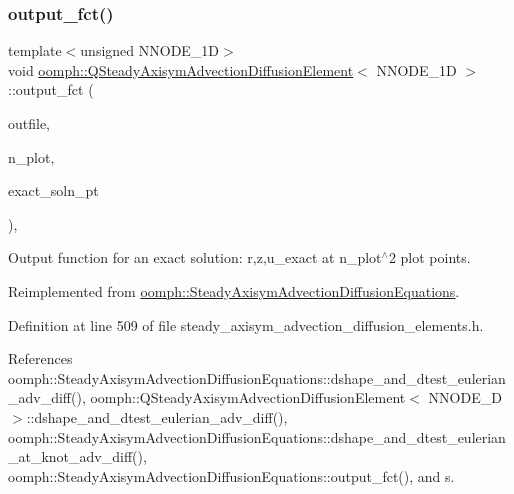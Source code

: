 \subsubsection{\texorpdfstring{output\+\_\+fct()}{output\_fct()}}
{\footnotesize\ttfamily template$<$unsigned N\+N\+O\+D\+E\+\_\+1D$>$ \\
void \hyperlink{classoomph_1_1QSteadyAxisymAdvectionDiffusionElement}{oomph\+::\+Q\+Steady\+Axisym\+Advection\+Diffusion\+Element}$<$ N\+N\+O\+D\+E\+\_\+1D $>$\+::output\+\_\+fct (\begin{DoxyParamCaption}\item[{std\+::ostream \&}]{outfile,  }\item[{const unsigned \&}]{n\+\_\+plot,  }\item[{\hyperlink{classoomph_1_1FiniteElement_a690fd33af26cc3e84f39bba6d5a85202}{Finite\+Element\+::\+Steady\+Exact\+Solution\+Fct\+Pt}}]{exact\+\_\+soln\+\_\+pt }\end{DoxyParamCaption})\hspace{0.3cm}{\ttfamily [inline]}, {\ttfamily [virtual]}}



Output function for an exact solution\+: r,z,u\+\_\+exact at n\+\_\+plot$^\wedge$2 plot points. 



Reimplemented from \hyperlink{classoomph_1_1SteadyAxisymAdvectionDiffusionEquations_a444263cb79d63da6bd1e7b47f9c60c72}{oomph\+::\+Steady\+Axisym\+Advection\+Diffusion\+Equations}.



Definition at line 509 of file steady\+\_\+axisym\+\_\+advection\+\_\+diffusion\+\_\+elements.\+h.



References oomph\+::\+Steady\+Axisym\+Advection\+Diffusion\+Equations\+::dshape\+\_\+and\+\_\+dtest\+\_\+eulerian\+\_\+adv\+\_\+diff(), oomph\+::\+Q\+Steady\+Axisym\+Advection\+Diffusion\+Element$<$ N\+N\+O\+D\+E\+\_\+D $>$\+::dshape\+\_\+and\+\_\+dtest\+\_\+eulerian\+\_\+adv\+\_\+diff(), oomph\+::\+Steady\+Axisym\+Advection\+Diffusion\+Equations\+::dshape\+\_\+and\+\_\+dtest\+\_\+eulerian\+\_\+at\+\_\+knot\+\_\+adv\+\_\+diff(), oomph\+::\+Steady\+Axisym\+Advection\+Diffusion\+Equations\+::output\+\_\+fct(), and s.

\mbox{\label{classoomph_1_1QSteadyAxisymAdvectionDiffusionElement_a493f0e3dc55e80f78016ae8f9c3e39cf}} 
